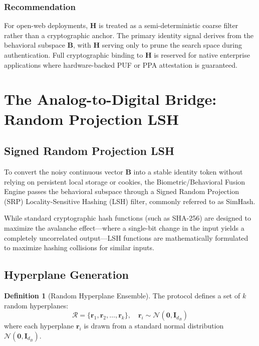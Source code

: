 \documentclass[11pt,twoside]{amsart}
\theoremstyle{plain}
\theoremstyle{definition}
\newtheorem{definition}[theorem]{Definition}
\theoremstyle{remark}
\newcommand{\bH}{\mathbf{H}}
\newcommand{\bB}{\mathbf{B}}
\newcommand{\br}{\mathbf{r}}
\newcommand{\calR}{\mathcal{R}}
\newcommand{\calN}{\mathcal{N}}
\begin{document}
\subsubsection{Recommendation}

For open-web deployments, $\bH$ is treated as a semi-deterministic coarse filter rather than a cryptographic anchor. The primary identity signal derives from the behavioral subspace $\bB$, with $\bH$ serving only to prune the search space during authentication. Full cryptographic binding to $\bH$ is reserved for native enterprise applications where hardware-backed PUF or PPA attestation is guaranteed.

\section{The Analog-to-Digital Bridge: Random Projection LSH}

\subsection{Signed Random Projection LSH}

To convert the noisy continuous vector $\bB$ into a stable identity token without relying on persistent local storage or cookies, the Biometric/Behavioral Fusion Engine passes the behavioral subspace through a Signed Random Projection (SRP) Locality-Sensitive Hashing (LSH) filter, commonly referred to as SimHash.

While standard cryptographic hash functions (such as SHA-256) are designed to maximize the avalanche effect---where a single-bit change in the input yields a completely uncorrelated output---LSH functions are mathematically formulated to maximize hashing collisions for similar inputs.

\subsection{Hyperplane Generation}

\begin{definition}[Random Hyperplane Ensemble]
\label{def:hyperplanes}
The protocol defines a set of $k$ random hyperplanes:
\begin{equation}
\calR = \{\br_1, \br_2, \ldots, \br_k\}, \quad \br_i \sim \calN(\mathbf{0}, \mathbf{I}_{d_B})
\end{equation}
where each hyperplane $\br_i$ is drawn from a standard normal distribution $\calN(\mathbf{0}, \mathbf{I}_{d_B})$.
\end{definition}
\end{document}
